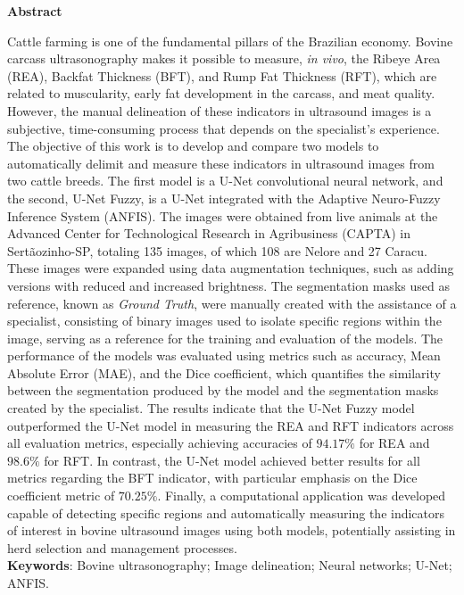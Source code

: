 \begin{center}
    {\LARGE \textbf{Abstract}}
\end{center}

Cattle farming is one of the fundamental pillars of the Brazilian economy. Bovine carcass ultrasonography makes it possible to measure, \textit{in vivo}, the Ribeye Area (REA), Backfat Thickness (BFT), and Rump Fat Thickness (RFT), which are related to muscularity, early fat development in the carcass, and meat quality. However, the manual delineation of these indicators in ultrasound images is a subjective, time-consuming process that depends on the specialist’s experience. The objective of this work is to develop and compare two models to automatically delimit and measure these indicators in ultrasound images from two cattle breeds. The first model is a U-Net convolutional neural network, and the second, U-Net Fuzzy, is a U-Net integrated with the Adaptive Neuro-Fuzzy Inference System (ANFIS). The images were obtained from live animals at the Advanced Center for Technological Research in Agribusiness (CAPTA) in Sertãozinho-SP, totaling 135 images, of which 108 are Nelore and 27 Caracu. These images were expanded using data augmentation techniques, such as adding versions with reduced and increased brightness. The segmentation masks used as reference, known as \textit{Ground Truth}, were manually created with the assistance of a specialist, consisting of binary images used to isolate specific regions within the image, serving as a reference for the training and evaluation of the models. The performance of the models was evaluated using metrics such as accuracy, Mean Absolute Error (MAE), and the Dice coefficient, which quantifies the similarity between the segmentation produced by the model and the segmentation masks created by the specialist. The results indicate that the U-Net Fuzzy model outperformed the U-Net model in measuring the REA and RFT indicators across all evaluation metrics, especially achieving accuracies of $94.17\%$ for REA and $98.6\%$ for RFT. In contrast, the U-Net model achieved better results for all metrics regarding the BFT indicator, with particular emphasis on the Dice coefficient metric of $70.25\%$. Finally, a computational application was developed capable of detecting specific regions and automatically measuring the indicators of interest in bovine ultrasound images using both models, potentially assisting in herd selection and management processes.
\vspace{1cm}
\\
\textbf{Keywords}: Bovine ultrasonography; Image delineation; Neural networks; U-Net; ANFIS.